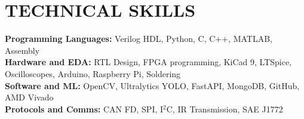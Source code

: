 \documentclass[letterpaper,11pt]{article}
\begin{document}
\section{TECHNICAL SKILLS}
 \begin{itemize}[leftmargin=0.15in, label={}]
    \small{\item{
     \textbf{Programming Languages:} Verilog HDL, Python, C, C++, MATLAB, Assembly \\
     \textbf{Hardware and EDA:} RTL Design, FPGA programming, KiCad 9, LTSpice, Oscilloscopes, Arduino, Raspberry Pi, Soldering \\
     \textbf{Software and ML:} OpenCV, Ultralytics YOLO, FastAPI, MongoDB, GitHub, AMD Vivado \\
     \textbf{Protocols and Comms:} CAN FD, SPI, I$^2$C, IR Transmission, SAE J1772
    }}
 \end{itemize}


\end{document}
